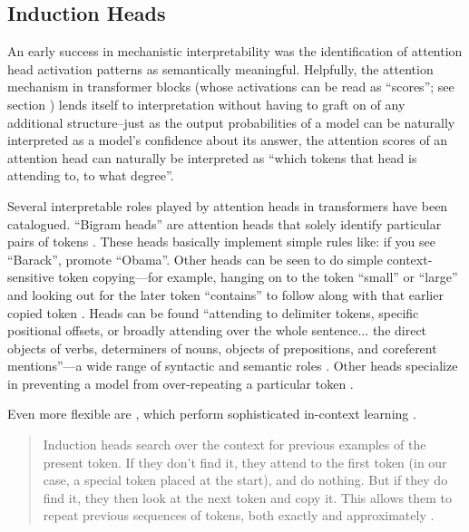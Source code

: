 \subsection{Induction Heads}

An early success in mechanistic interpretability was the identification of
attention head activation patterns as semantically meaningful. Helpfully, the
attention mechanism in transformer blocks (whose activations can be read as
``scores''; see section ) lends itself to
interpretation without having to graft on of any additional structure--just as
the output probabilities of a model can be naturally interpreted as a model's
confidence about its answer, the attention scores of an attention head can
naturally be interpreted as ``which tokens that head is attending to, to what
degree''.

Several interpretable roles played by attention heads in transformers have been
catalogued. ``Bigram heads'' are attention heads that solely identify
particular pairs of tokens \cite{elhage2021mathematical}. These heads basically
implement simple rules like: if you see ``Barack'', promote ``Obama''. Other
heads can be seen to do simple context-sensitive token copying---for example,
hanging on to the token ``small'' or ``large'' and looking out for the later
token ``contains'' to follow along with that earlier copied token
\cite{elhage2021mathematical}. Heads can be found ``attending to delimiter
tokens, specific positional offsets, or broadly attending over the whole
sentence... the direct objects of verbs, determiners of nouns, objects of
prepositions, and coreferent mentions''---a wide range of syntactic and
semantic roles \cite{clark2019does, voita-etal-2019-analyzing}. Other heads
specialize in preventing a model from over-repeating a particular token
\cite{mcdougall2023copy}.

Even more flexible are , which perform sophisticated
in-context learning \cite{elhage2021mathematical,olsson2022context}.

\begin{quote}
Induction heads search over the context for previous examples of the present
token. If they don't find it, they attend to the first token (in our case, a
special token placed at the start), and do nothing. But if they do find it,
they then look at the next token and copy it. This allows them to repeat
previous sequences of tokens, both exactly and approximately
\cite{elhage2021mathematical}.
\end{quote}

